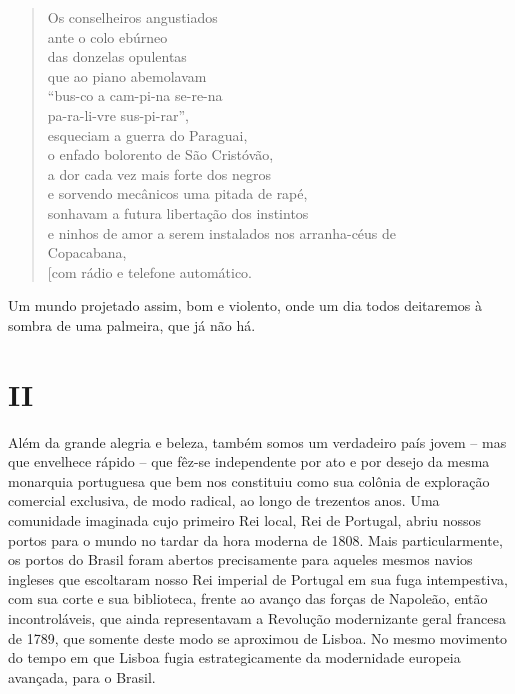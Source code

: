 \begin{verse}
Os conselheiros angustiados\\
ante o colo ebúrneo\\
das donzelas opulentas\\
que ao piano abemolavam\\
``bus-co a cam-pi-na se-re-na\\
pa-ra-li-vre sus-pi-rar'',\\
esqueciam a guerra do Paraguai,\\
o enfado bolorento de São Cristóvão,\\
\hspace{15pt}a dor cada vez mais forte dos negros\\
e sorvendo mecânicos uma pitada de rapé,\\
sonhavam a futura libertação dos instintos\\
e ninhos de amor a serem instalados nos \qb{}arranha-céus de\\
Copacabana,\\
{[}com rádio e telefone automático.
\end{verse}

Um mundo projetado assim, bom e violento, onde um dia todos deitaremos à
sombra de uma palmeira, que já não há.

\section{II}

Além da grande alegria e beleza, também somos um verdadeiro país jovem
-- mas que envelhece rápido -- que fêz-se independente por ato e por
desejo da mesma monarquia portuguesa que bem nos constituiu como sua
colônia de exploração comercial exclusiva, de modo radical, ao longo de
trezentos anos. Uma comunidade imaginada cujo primeiro Rei local, Rei de
Portugal, abriu nossos portos para o mundo no tardar da hora moderna de
1808. Mais particularmente, os portos do Brasil foram abertos
precisamente para aqueles mesmos navios ingleses que escoltaram nosso
Rei imperial de Portugal em sua fuga intempestiva, com sua corte e sua
biblioteca, frente ao avanço das forças de Napoleão, então
incontroláveis, que ainda representavam a Revolução modernizante geral
francesa de 1789, que somente deste modo se aproximou de Lisboa. No
mesmo movimento do tempo em que Lisboa fugia estrategicamente da
modernidade europeia avançada, para o Brasil.

